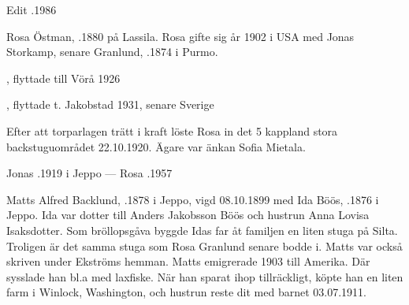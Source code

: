 Edit .1986



Rosa Östman, .1880 på Lassila. Rosa gifte sig år 1902 i USA med Jonas Storkamp, senare Granlund,  .1874 i Purmo.
\begin{jhchildren}
  \item {}, flyttade till Vörå 1926
  \item {}
  \item {}
  \item {}
  \item {}, flyttade t. Jakobstad 1931, senare Sverige
\end{jhchildren}

Efter att torparlagen trätt i kraft löste Rosa in det 5 kappland stora backstuguområdet 22.10.1920. Ägare var änkan Sofia Mietala.

Jonas .1919 i Jeppo  --- 	Rosa .1957


Matts Alfred Backlund, .1878 i Jeppo, vigd 08.10.1899 med Ida Böös, .1876 i Jeppo. Ida var dotter till Anders Jakobsson Böös och hustrun Anna Lovisa Isaksdotter. Som bröllopsgåva byggde Idas far åt familjen en liten stuga på Silta. Troligen är det samma stuga som Rosa Granlund senare bodde i. Matts var också skriven under Ekströms hemman. Matts emigrerade 1903 till Amerika. Där sysslade han bl.a med laxfiske. När han sparat ihop tillräckligt, köpte han en liten farm i Winlock, Washington, och hustrun reste dit med barnet 03.07.1911.
\begin{jhchildren}
  \item {}
  \item {}
  \item {}
  \item {}
  \item {}
\end{jhchildren}



